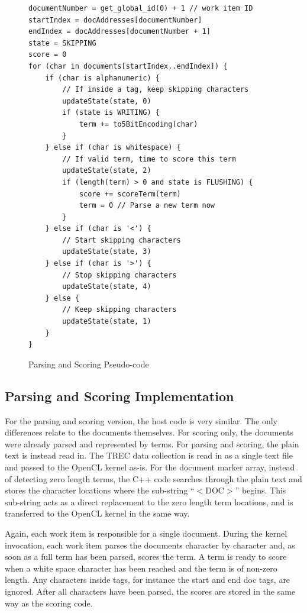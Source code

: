 \begin{figure}[H]
\small\begin{verbatim}
documentNumber = get_global_id(0) + 1 // work item ID
startIndex = docAddresses[documentNumber]
endIndex = docAddresses[documentNumber + 1]
state = SKIPPING
score = 0
for (char in documents[startIndex..endIndex]) {
    if (char is alphanumeric) {
        // If inside a tag, keep skipping characters
        updateState(state, 0)
        if (state is WRITING) {
            term += to5BitEncoding(char)
        }
    } else if (char is whitespace) {
        // If valid term, time to score this term
        updateState(state, 2)
        if (length(term) > 0 and state is FLUSHING) {
            score += scoreTerm(term)
            term = 0 // Parse a new term now
        }
    } else if (char is '<') {
        // Start skipping characters
        updateState(state, 3)
    } else if (char is '>') {
        // Stop skipping characters
        updateState(state, 4)
    } else {
        // Keep skipping characters
        updateState(state, 1)
    }
}
\end{verbatim}
\caption{Parsing and Scoring Pseudo-code}
\label{fig:parsingScoringPseudocode}
\end{figure}

\subsection{Parsing and Scoring Implementation}

For the parsing and scoring version, the host code is very similar. The only
differences relate to the documents themselves. For scoring only, the documents
were already parsed and represented by terms. For parsing and scoring, the plain
text is instead read in. The TREC data collection is read in as a single text
file and passed to the OpenCL kernel as-is. For the document marker array,
instead of detecting zero length terms, the C++ code searches through the plain
text and stores the character locations where the sub-string ``$<$DOC$>$''
begins. This sub-string acts as a direct replacement to the zero length term
locations, and is transferred to the OpenCL kernel in the same way.

Again, each work item is responsible for a single document. During the kernel
invocation, each work item parses the documents character by character and, as
soon as a full term has been parsed, scores the term. A term is ready to score
when a white space character has been reached and the term is of non-zero
length. Any characters inside tags, for instance the start and end doc tags, are
ignored. After all characters have been parsed, the scores are stored in the
same way as the scoring code.

